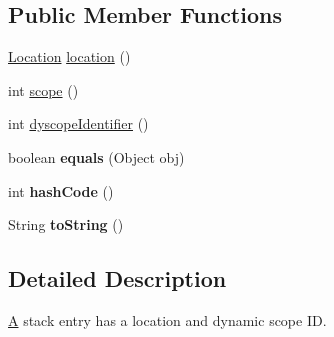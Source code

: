 \subsection*{Public Member Functions}
\begin{DoxyCompactItemize}
\item 
\hyperlink{interfaceedu_1_1udel_1_1cis_1_1vsl_1_1civl_1_1model_1_1IF_1_1location_1_1Location}{Location} \hyperlink{classedu_1_1udel_1_1cis_1_1vsl_1_1civl_1_1state_1_1common_1_1immutable_1_1ImmutableStackEntry_a790e0d9b1e632451374dc092664dddb2}{location} ()
\item 
int \hyperlink{classedu_1_1udel_1_1cis_1_1vsl_1_1civl_1_1state_1_1common_1_1immutable_1_1ImmutableStackEntry_a798f538364a9b130f64a994a557cf510}{scope} ()
\item 
int \hyperlink{classedu_1_1udel_1_1cis_1_1vsl_1_1civl_1_1state_1_1common_1_1immutable_1_1ImmutableStackEntry_aed6abcd2dc5e2a2f769d8c8993cb2b05}{dyscope\+Identifier} ()
\item 
\hypertarget{classedu_1_1udel_1_1cis_1_1vsl_1_1civl_1_1state_1_1common_1_1immutable_1_1ImmutableStackEntry_a09de5d2021e18617fd0a4d58c2477eb6}{}boolean {\bfseries equals} (Object obj)\label{classedu_1_1udel_1_1cis_1_1vsl_1_1civl_1_1state_1_1common_1_1immutable_1_1ImmutableStackEntry_a09de5d2021e18617fd0a4d58c2477eb6}

\item 
\hypertarget{classedu_1_1udel_1_1cis_1_1vsl_1_1civl_1_1state_1_1common_1_1immutable_1_1ImmutableStackEntry_a0e67b0453d2565c5caf4b043c18c72c9}{}int {\bfseries hash\+Code} ()\label{classedu_1_1udel_1_1cis_1_1vsl_1_1civl_1_1state_1_1common_1_1immutable_1_1ImmutableStackEntry_a0e67b0453d2565c5caf4b043c18c72c9}

\item 
\hypertarget{classedu_1_1udel_1_1cis_1_1vsl_1_1civl_1_1state_1_1common_1_1immutable_1_1ImmutableStackEntry_afda05a3af50ff15277ef08bae4eeb8c0}{}String {\bfseries to\+String} ()\label{classedu_1_1udel_1_1cis_1_1vsl_1_1civl_1_1state_1_1common_1_1immutable_1_1ImmutableStackEntry_afda05a3af50ff15277ef08bae4eeb8c0}

\end{DoxyCompactItemize}


\subsection{Detailed Description}
\hyperlink{structA}{A} stack entry has a location and dynamic scope I\+D. 

